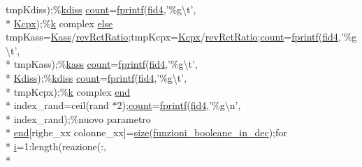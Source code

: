 \begin{DoxyCompactItemize}
tmp\-Kdiss);\%\hyperlink{a00070_acb874616f80abe1a595c7c9e12040cd5}{kdiss} \hyperlink{a00068_aa0a4866d2600caeb20cfacee8eefc922}{count}=\hyperlink{a00068_aa6dc40efe43a338c9ff278260d95b4d9}{fprintf}(\hyperlink{a00068_a28f0b3b80ef3c84a4a00660a307d2147}{fid4},'\%g\textbackslash{}t', \\*
\hyperlink{a00071_aaea32371e0f1645dcea44ce4d4a3d147}{Kcpx});\%\hyperlink{a00068_abf70355c2e58f64c6b18bda1b9bccfd7}{k} complex \hyperlink{a00031_af5946383720aa572eb93e1e63afc23c2}{else} tmp\-Kass=\hyperlink{a00071_a484afe97369bc993daaa71613dd2a665}{Kass}/\hyperlink{a00071_aa7d97d27bd1a172a2f0ad49ef13ef8ac}{rev\-Rct\-Ratio};tmp\-Kcpx=\hyperlink{a00071_aaea32371e0f1645dcea44ce4d4a3d147}{Kcpx}/\hyperlink{a00071_aa7d97d27bd1a172a2f0ad49ef13ef8ac}{rev\-Rct\-Ratio};\hyperlink{a00068_aa0a4866d2600caeb20cfacee8eefc922}{count}=\hyperlink{a00068_aa6dc40efe43a338c9ff278260d95b4d9}{fprintf}(\hyperlink{a00068_a28f0b3b80ef3c84a4a00660a307d2147}{fid4},'\%g\textbackslash{}t', \\*
tmp\-Kass);\%\hyperlink{a00070_a8d22b96a5ece64359002562ebc1fbfc5}{kass} \hyperlink{a00068_aa0a4866d2600caeb20cfacee8eefc922}{count}=\hyperlink{a00068_aa6dc40efe43a338c9ff278260d95b4d9}{fprintf}(\hyperlink{a00068_a28f0b3b80ef3c84a4a00660a307d2147}{fid4},'\%g\textbackslash{}t', \\*
\hyperlink{a00071_a51a314f9df0eaa4488a1b264d1de0173}{Kdiss});\%\hyperlink{a00070_acb874616f80abe1a595c7c9e12040cd5}{kdiss} \hyperlink{a00068_aa0a4866d2600caeb20cfacee8eefc922}{count}=\hyperlink{a00068_aa6dc40efe43a338c9ff278260d95b4d9}{fprintf}(\hyperlink{a00068_a28f0b3b80ef3c84a4a00660a307d2147}{fid4},'\%g\textbackslash{}t', \\*
tmp\-Kcpx);\%\hyperlink{a00068_abf70355c2e58f64c6b18bda1b9bccfd7}{k} complex \hyperlink{a00025_afb358f48b1646c750fb9da6c6585be2b}{end} \\*
index\-\_\-rand=ceil(rand $\ast$2);\hyperlink{a00068_aa0a4866d2600caeb20cfacee8eefc922}{count}=\hyperlink{a00068_aa6dc40efe43a338c9ff278260d95b4d9}{fprintf}(\hyperlink{a00068_a28f0b3b80ef3c84a4a00660a307d2147}{fid4},'\%g\textbackslash{}n', \\*
index\-\_\-rand);\%nuovo parametro \\*
\hyperlink{a00025_afb358f48b1646c750fb9da6c6585be2b}{end}\mbox{[}righe\-\_\-xx colonne\-\_\-xx\mbox{]}=\hyperlink{a00062_ae113ea7f9e515a12ac4b5595c6faf61e}{size}(\hyperlink{a00071_aca80ac3e93dabd95e623a51f90fb37b6}{funzioni\-\_\-booleane\-\_\-in\-\_\-dec});for \\*
\hyperlink{a00071_ad3efca1ea6e3333daf30719ee0501862}{i}=1\-:length(reazione(\-:, \\*

\end{DoxyCompactItemize}

